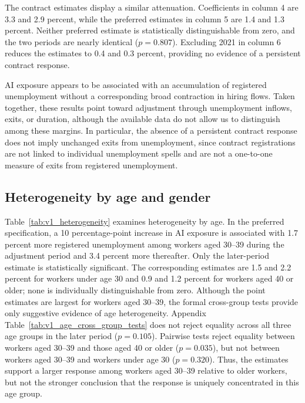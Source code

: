 \documentclass[11pt]{article}
\begin{document}
The contract estimates display a similar attenuation. Coefficients in column 4 are 3.3 and 2.9 percent, while the preferred estimates in column 5 are 1.4 and 1.3 percent. Neither preferred estimate is statistically distinguishable from zero, and the two periods are nearly identical (\(p=0.807\)). Excluding 2021 in column 6 reduces the estimates to 0.4 and 0.3 percent, providing no evidence of a persistent contract response. 

AI exposure appears to be associated with an accumulation of registered unemployment without a corresponding broad contraction in hiring flows. Taken together, these results point toward adjustment through unemployment inflows, exits, or duration, although the available data do not allow us to distinguish among these margins. In particular, the absence of a persistent contract response does not imply unchanged exits from unemployment, since contract registrations are not linked to individual unemployment spells and are not a one-to-one measure of exits from registered unemployment.



\subsection{Heterogeneity by age and gender}
\label{sec:v1_heterogeneity}


Table~\ref{tab:v1_heterogeneity} examines heterogeneity by age. In the preferred specification, a 10 percentage-point increase in AI exposure is associated with 1.7 percent more registered unemployment among workers aged 30--39 during the adjustment period and 3.4 percent more thereafter. Only the later-period estimate is statistically significant. The corresponding estimates are 1.5 and 2.2 percent for workers under age 30 and 0.9 and 1.2 percent for workers aged 40 or older; none is individually distinguishable from zero. Although the point estimates are largest for workers aged 30--39, the formal cross-group tests provide only suggestive evidence of age heterogeneity. Appendix Table~\ref{tab:v1_age_cross_group_tests} does not reject equality across all three age groups in the later period (\(p=0.105\)). Pairwise tests reject equality between workers aged 30--39 and those aged 40 or older (\(p=0.035\)), but not between workers aged 30--39 and workers under age 30 (\(p=0.320\)). Thus, the estimates support a larger response among workers aged 30--39 relative to older workers, but not the stronger conclusion that the response is uniquely concentrated in this age group.
\end{document}
